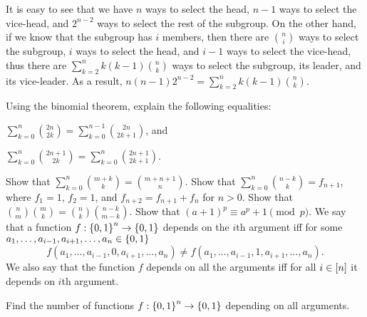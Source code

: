 \begin{chapterendexercises}
\begin{solution}
\begin{enumerate}
          It is easy to see that we have $n$ ways to select the head, $n - 1$
          ways to select the vice-head, and $2^{n - 2}$ ways
          to select the rest of the subgroup. On the other hand, if we know that the
          subgroup has $i$ members, then there are $\binom{n}{i}$ ways to select the
          subgroup, $i$ ways to select the head, and $i - 1$ ways to select the
          vice-head, thus there are $\sum_{k = 2}^n k (k - 1) \binom{n}{k}$ ways to
          select the subgroup, its leader, and its vice-leader. As a result,
          $n (n - 1) 2^{n - 2} = \sum_{k = 2}^n k (k - 1) \binom{n}{k}$.
      \end{enumerate}
    \end{solution}


  \exercise Using the binomial theorem, explain the following equalities:
    \begin{enumerate*}
      \item $\sum_{k = 0}^{n} \binom{2n}{2k} =
        \sum_{k = 0}^{n - 1} \binom{2n}{2k + 1}$,
        and
      \item $\sum_{k = 0}^{n} \binom{2n + 1}{2k} =
        \sum_{k = 0}^n \binom{2n + 1}{2k + 1}$.
    \end{enumerate*}

  \exercise[recommended] Show that $\sum_{k = 0}^n \binom{m + k}{k} =
    \binom{m + n + 1}{n}$.
  \exercise Show that $\sum_{k = 0}^n \binom{n - k}{k} = f_{n + 1}$,
    where $f_1 = 1$, $f_2 = 1$, and $f_{n + 2} = f_{n + 1} + f_n$ for $n > 0$.
  \exercise Show that $\binom{n}{m} \binom{m}{k} =
    \binom{n}{k} \binom{n - k}{m - k}$.
  \exercise[recommended] Show that
    $(a + 1)^p \equiv a^p + 1 \pmod{p}$.
  \exercise[recommended] We say that a function 
    $f : \set{0, 1}^n \to \set{0, 1}$ depends on the $i$th argument iff for some
    $a_1, \dots, a_{i - 1}, a_{i + 1}, \dots, a_n \in \set{0, 1}$
    \[
      f(a_1, \dots, a_{i - 1}, 0, a_{i + 1}, \dots, a_n) \neq
      f(a_1, \dots, a_{i - 1}, 1, a_{i + 1}, \dots, a_n).
    \]
    We also say that the function $f$ depends on all the arguments iff for all
    $i \in {[{n}]}$ it depends on $i$th argument.

    Find the number of functions $f : \set{0, 1}^n \to \set{0, 1}$ depending on all
    arguments.


\end{chapterendexercises}

